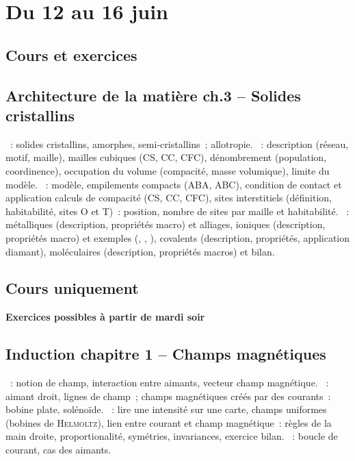 \documentclass[a4paper, 11pt, final, garamond]{book}
\begin{document}
\setcounter{chapter}{29}

\chapter{Du 12 au 16 juin}

\section{Cours et exercices}
\section*{Architecture de la matière ch.3 -- Solides cristallins}
\begin{enumerate}[label=\Roman*]
  ~: solides cristallins, amorphes,
    semi-cristallins~; allotropie.
  ~: description (réseau, motif, maille),
    mailles cubiques (CS, CC, CFC), dénombrement (population, coordinence),
    occupation du volume (compacité, masse volumique), limite du modèle.
  ~: modèle, empilements compacts (ABA,
    ABC), condition de contact et application calculs de compacité (CS, CC,
    CFC), sites interstitiels (définition, habitabilité, sites O et T)~:
    position, nombre de sites par maille et habitabilité.
  ~: métalliques (description, propriétés
  macro) et alliages, ioniques (description, propriétés macro) et exemples
  (, , ), covalents (description, propriétés,
  application diamant), moléculaires (description, propriétés macros) et bilan.
\end{enumerate}

\section{Cours uniquement}
\begin{center}
  \begin{framed}
    \Large \bfseries
    Exercices possibles à partir de mardi soir
  \end{framed}
\end{center}
\section*{Induction chapitre 1 -- Champs magnétiques}
\begin{enumerate}[label=\Roman*]
  ~: notion de champ, interaction entre aimants, vecteur
  champ magnétique.
  ~: aimant droit, lignes de
  champ~; champs magnétiques créés par des courants~: bobine plate, solénoïde.
  ~: lire une intensité sur une carte,
  champs uniformes (bobines de \textsc{Helmoltz}), lien entre courant et champ
  magnétique~: règles de la main droite, proportionalité, symétries,
  invariances, exercice bilan.
  ~: boucle de courant, cas des aimants.
\end{enumerate}
\end{document}
